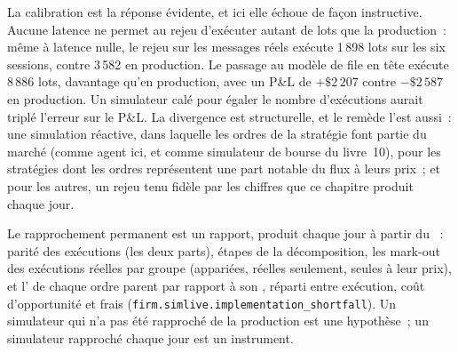 La calibration est la réponse évidente, et ici elle échoue de façon instructive. Aucune latence ne permet au rejeu d'exécuter autant de lots que la production~: même à latence nulle, le rejeu sur les
messages réels exécute 1\,898 lots sur les six sessions, contre 3\,582 en production. Le passage au modèle de file en tête exécute 8\,886 lots, davantage qu'en production, avec un P\&L de $+\$2\,207$
contre $-\$2\,587$ en production. Un simulateur calé pour égaler le nombre d'exécutions aurait triplé l'erreur sur le P\&L. La divergence est structurelle, et le remède l'est aussi~: une
simulation réactive, dans laquelle les ordres de la stratégie font partie du marché (comme agent ici, et comme simulateur de bourse du livre~10), pour les stratégies dont les ordres
représentent une part notable du flux à leurs prix~; et pour les autres, un rejeu tenu fidèle par les chiffres que ce chapitre produit chaque jour.

Le rapprochement permanent est un rapport, produit chaque jour à partir du ~: parité des exécutions (les deux parts), étapes de la décomposition, les mark-out des exécutions réelles par
groupe (appariées, réelles seulement, seules à leur prix), et l' de chaque ordre parent par rapport à son , réparti entre exécution, coût d'opportunité et
frais (\texttt{firm.simlive.implementation\_shortfall}). Un simulateur qui n'a pas été rapproché de la production est une hypothèse~; un simulateur rapproché chaque jour est un
instrument.

\begin{omfigure}

\label{fig:rs:simulation-versus-live:sessions}
\end{omfigure}

